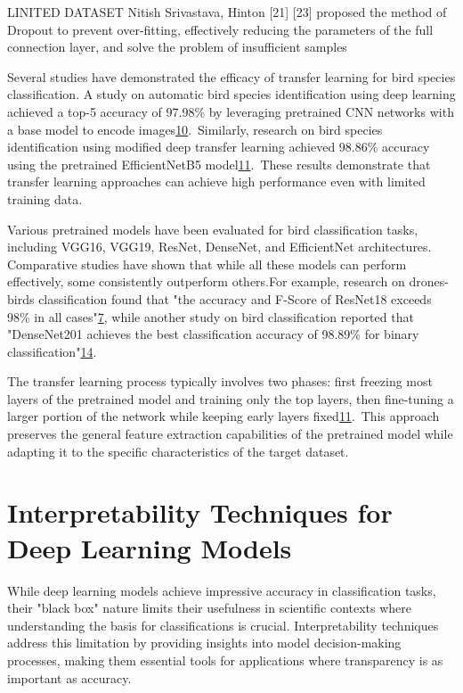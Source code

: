 \documentclass[a4paper,12pt]{article}
\begin{document}
LINITED DATASET Nitish
Srivastava, Hinton [21] [23] proposed the method of Dropout to prevent over-fitting, effectively reducing the
parameters of the full connection layer, and solve the problem of insufficient samples\cite{zhao2017transfer}

Several studies have demonstrated the efficacy of transfer learning for bird species classification. A study on automatic bird species identification using deep learning achieved a top-5 accuracy of 97.98\% by leveraging pretrained CNN networks with a base model to encode images\href{https://www.semanticscholar.org/paper/41b0718279f408654094557156d4eeeb0067b2c4}{10}. Similarly, research on bird species identification using modified deep transfer learning achieved 98.86\% accuracy using the pretrained EfficientNetB5 model\href{https://www.semanticscholar.org/paper/770ee68d1b136cd098a018a399d1f69af29faae0}{11}. These results demonstrate that transfer learning approaches can achieve high performance even with limited training data.

Various pretrained models have been evaluated for bird classification tasks, including VGG16, VGG19, ResNet, DenseNet, and EfficientNet architectures. Comparative studies have shown that while all these models can perform effectively, some consistently outperform others.\cite{santiago2024comparative}For example, research on drones-birds classification found that "the accuracy and F-Score of ResNet18 exceeds 98\% in all cases"\href{https://www.semanticscholar.org/paper/c16f57236555aae3f600ef8f1978eff10b410233}{7}, while another study on bird classification reported that "DenseNet201 achieves the best classification accuracy of 98.89\% for binary classification"\href{https://www.semanticscholar.org/paper/6529ad5f1094a8d9b0ab38db163c7fdaad2a1d9c}{14}.

The transfer learning process typically involves two phases: first freezing most layers of the pretrained model and training only the top layers, then fine-tuning a larger portion of the network while keeping early layers fixed\href{https://www.semanticscholar.org/paper/770ee68d1b136cd098a018a399d1f69af29faae0}{11}. This approach preserves the general feature extraction capabilities of the pretrained model while adapting it to the specific characteristics of the target dataset.

\section*{Interpretability Techniques for Deep Learning Models}
While deep learning models achieve impressive accuracy in classification tasks, their "black box" nature limits their usefulness in scientific contexts where understanding the basis for classifications is crucial. Interpretability techniques address this limitation by providing insights into model decision-making processes, making them essential tools for applications where transparency is as important as accuracy.
\end{document}
